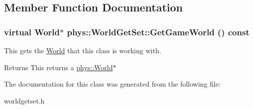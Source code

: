 \subsection{Member Function Documentation}
\hypertarget{classphys_1_1WorldGetSet_ae11f48a9152834423647ea44e7fd7ee5}{
\subsubsection[{GetGameWorld}]{\setlength{\rightskip}{0pt plus 5cm}virtual {\bf World}$\ast$ phys::WorldGetSet::GetGameWorld () const}}
\label{dc/d4f/classphys_1_1WorldGetSet_ae11f48a9152834423647ea44e7fd7ee5}


This gets the \hyperlink{classphys_1_1World}{World} that this class is working with. 

\begin{DoxyReturn}{Returns}
This returns a \hyperlink{classphys_1_1World}{phys::World}$\ast$ 
\end{DoxyReturn}


The documentation for this class was generated from the following file:\begin{DoxyCompactItemize}
\item 
worldgetset.h\end{DoxyCompactItemize}
